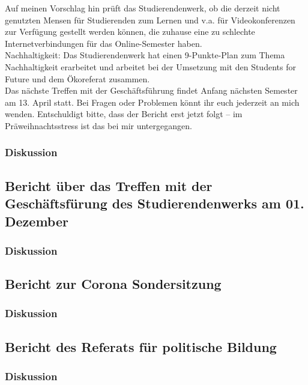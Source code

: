 Auf meinen Vorschlag hin prüft das Studierendenwerk, ob die derzeit nicht genutzten Mensen für Studierenden zum Lernen und v.a. für Videokonferenzen zur Verfügung gestellt werden können, die zuhause eine zu schlechte Internetverbindungen für das Online-Semester haben.\\
Nachhaltigkeit: Das Studierendenwerk hat einen 9-Punkte-Plan zum Thema Nachhaltigkeit erarbeitet und arbeitet bei der Umsetzung mit den Students for Future und dem Ökoreferat zusammen.\\
Das nächste Treffen mit der Geschäftsführung findet Anfang nächsten Semester am 13. April statt. Bei Fragen oder Problemen könnt ihr euch jederzeit an mich wenden. Entschuldigt bitte, dass der Bericht erst jetzt folgt – im Präweihnachtsstress ist das bei mir untergegangen.
\subsubsection{Diskussion}
\ul{
}

\subsection{ Bericht über das Treffen mit der Geschäftsfürung des Studierendenwerks am 01. Dezember}
\subsubsection{Diskussion}
\ul{
}

\subsection{Bericht zur Corona Sondersitzung}
\subsubsection{Diskussion}
\ul{
}

\subsection{Bericht des Referats für politische Bildung}
\subsubsection{Diskussion}
\ul{
}

